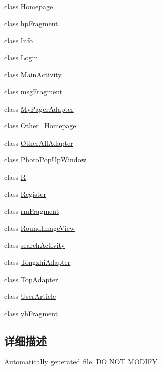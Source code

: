 \begin{DoxyCompactItemize}
class \mbox{\hyperlink{classcom_1_1example_1_1twitter_1_1_homepage}{Homepage}}
\item 
class \mbox{\hyperlink{classcom_1_1example_1_1twitter_1_1hp_fragment}{hp\+Fragment}}
\item 
class \mbox{\hyperlink{classcom_1_1example_1_1twitter_1_1_info}{Info}}
\item 
class \mbox{\hyperlink{classcom_1_1example_1_1twitter_1_1_login}{Login}}
\item 
class \mbox{\hyperlink{classcom_1_1example_1_1twitter_1_1_main_activity}{Main\+Activity}}
\item 
class \mbox{\hyperlink{classcom_1_1example_1_1twitter_1_1msg_fragment}{msg\+Fragment}}
\item 
class \mbox{\hyperlink{classcom_1_1example_1_1twitter_1_1_my_pager_adapter}{My\+Pager\+Adapter}}
\item 
class \mbox{\hyperlink{classcom_1_1example_1_1twitter_1_1_other___homepage}{Other\+\_\+\+Homepage}}
\item 
class \mbox{\hyperlink{classcom_1_1example_1_1twitter_1_1_other_all_adapter}{Other\+All\+Adapter}}
\item 
class \mbox{\hyperlink{classcom_1_1example_1_1twitter_1_1_photo_pop_up_window}{Photo\+Pop\+Up\+Window}}
\item 
class \mbox{\hyperlink{classcom_1_1example_1_1twitter_1_1_r}{R}}
\item 
class \mbox{\hyperlink{classcom_1_1example_1_1twitter_1_1_register}{Register}}
\item 
class \mbox{\hyperlink{classcom_1_1example_1_1twitter_1_1rm_fragment}{rm\+Fragment}}
\item 
class \mbox{\hyperlink{classcom_1_1example_1_1twitter_1_1_round_image_view}{Round\+Image\+View}}
\item 
class \mbox{\hyperlink{classcom_1_1example_1_1twitter_1_1search_activity}{search\+Activity}}
\item 
class \mbox{\hyperlink{classcom_1_1example_1_1twitter_1_1_tongzhi_adapter}{Tongzhi\+Adapter}}
\item 
class \mbox{\hyperlink{classcom_1_1example_1_1twitter_1_1_top_adapter}{Top\+Adapter}}
\item 
class \mbox{\hyperlink{classcom_1_1example_1_1twitter_1_1_user_article}{User\+Article}}
\item 
class \mbox{\hyperlink{classcom_1_1example_1_1twitter_1_1yh_fragment}{yh\+Fragment}}
\end{DoxyCompactItemize}


\subsection{详细描述}
Automatically generated file. DO N\+OT M\+O\+D\+I\+FY 